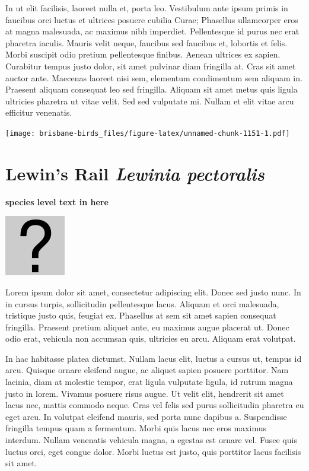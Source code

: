\documentclass[]{book}
\let\origfigure\figure
\let\endorigfigure\endfigure
\renewenvironment{figure}[1][2] {
  \expandafter\origfigure\expandafter[H]
} {
  \endorigfigure
}
\begin{document}
In ut elit facilisis, laoreet nulla et, porta leo. Vestibulum ante ipsum
primis in faucibus orci luctus et ultrices posuere cubilia Curae;
Phasellus ullamcorper eros at magna malesuada, ac maximus nibh
imperdiet. Pellentesque id purus nec erat pharetra iaculis. Mauris velit
neque, faucibus sed faucibus et, lobortis et felis. Morbi suscipit odio
pretium pellentesque finibus. Aenean ultrices ex sapien. Curabitur
tempus justo dolor, sit amet pulvinar diam fringilla at. Cras sit amet
auctor ante. Maecenas laoreet nisi sem, elementum condimentum sem
aliquam in. Praesent aliquam consequat leo sed fringilla. Aliquam sit
amet metus quis ligula ultricies pharetra ut vitae velit. Sed sed
vulputate mi. Nullam et elit vitae arcu efficitur venenatis.

\begin{figure}
\centering
\texttt{[image: brisbane-birds\_files/figure-latex/unnamed-chunk-1151-1.pdf]}
\caption{\label{fig:unnamed-chunk-1151}insert figure caption}
\end{figure}

\section{\texorpdfstring{Lewin's Rail \emph{Lewinia
pectoralis}}{Lewin's Rail Lewinia pectoralis}}\label{lewins-rail-lewinia-pectoralis}

\textbf{species level text in here}

\begin{figure}
\centering
\includegraphics{assets/missing.png}
\caption{No image for species}
\end{figure}

Lorem ipsum dolor sit amet, consectetur adipiscing elit. Donec sed justo
nunc. In in cursus turpis, sollicitudin pellentesque lacus. Aliquam et
orci malesuada, tristique justo quis, feugiat ex. Phasellus at sem sit
amet sapien consequat fringilla. Praesent pretium aliquet ante, eu
maximus augue placerat ut. Donec odio erat, vehicula non accumsan quis,
ultricies eu arcu. Aliquam erat volutpat.

In hac habitasse platea dictumst. Nullam lacus elit, luctus a cursus ut,
tempus id arcu. Quisque ornare eleifend augue, ac aliquet sapien posuere
porttitor. Nam lacinia, diam at molestie tempor, erat ligula vulputate
ligula, id rutrum magna justo in lorem. Vivamus posuere risus augue. Ut
velit elit, hendrerit sit amet lacus nec, mattis commodo neque. Cras vel
felis sed purus sollicitudin pharetra eu eget arcu. In volutpat eleifend
mauris, sed porta nunc dapibus a. Suspendisse fringilla tempus quam a
fermentum. Morbi quis lacus nec eros maximus interdum. Nullam venenatis
vehicula magna, a egestas est ornare vel. Fusce quis luctus orci, eget
congue dolor. Morbi luctus est justo, quis porttitor lacus facilisis sit
amet.
\end{document}
